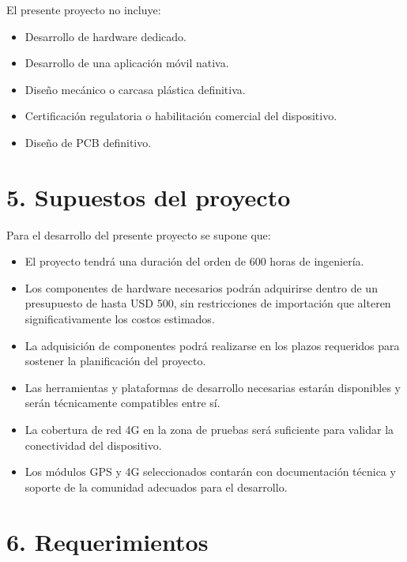 \documentclass[
11pt, %
]{charter}
\begin{document}
El presente proyecto no incluye:
\begin{itemize}
	\item Desarrollo de hardware dedicado.
	\item Desarrollo de una aplicación móvil nativa.
	\item Diseño mecánico o carcasa plástica definitiva.
	\item Certificación regulatoria o habilitación comercial del dispositivo.
	\item Diseño de PCB definitivo.
\end{itemize}


\section{5. Supuestos del proyecto}
\label{sec:supuestos}

Para el desarrollo del presente proyecto se supone que:
\begin{itemize}
	\item El proyecto tendrá una duración del orden de 600 horas de ingeniería.
	\item Los componentes de hardware necesarios podrán adquirirse dentro de un presupuesto de hasta USD 500, sin restricciones de importación que alteren significativamente los costos estimados.
	\item La adquisición de componentes podrá realizarse en los plazos requeridos para sostener la planificación del proyecto.
	\item Las herramientas y plataformas de desarrollo necesarias estarán disponibles y serán técnicamente compatibles entre sí.
	\item La cobertura de red 4G en la zona de pruebas será suficiente para validar la conectividad del dispositivo.
	\item Los módulos GPS y 4G seleccionados contarán con documentación técnica y soporte de la comunidad adecuados para el desarrollo.
\end{itemize}


\section{6. Requerimientos}
\label{sec:requerimientos}
\end{document}
